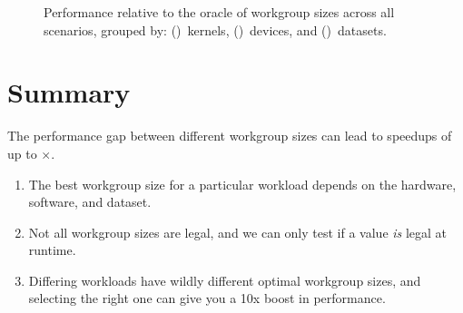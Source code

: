 \begin{figure}

\caption{%
  Performance relative to the oracle of workgroup sizes across all
  scenarios, grouped by: ()~kernels,
  ()~devices, and
  ()~datasets.%
}
\label{fig:performances}
\end{figure}


\section{Summary}

The performance gap between different workgroup sizes can lead to
speedups of up to $\times$.


\begin{enumerate}
\item The best workgroup size for a particular workload depends on the
  hardware, software, and dataset.
\item Not all workgroup sizes are legal, and we can only test if a
  value \emph{is} legal at runtime.
\item Differing workloads have wildly different optimal workgroup
  sizes, and selecting the right one can give you a 10x boost in
  performance.
\end{enumerate}

